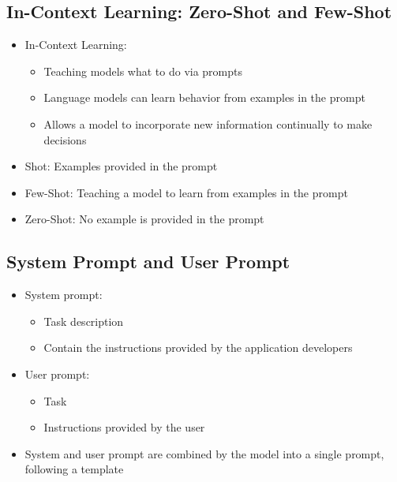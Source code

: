 \documentclass[11pt]{scrartcl}
\begin{document}
\subsection*{In-Context Learning: Zero-Shot and Few-Shot}
\begin{itemize}
	\item In-Context Learning: 
	\begin{itemize}
		\item Teaching models what to do via prompts
		\item Language models can learn behavior from examples in the prompt
		\item Allows a model to incorporate new information continually to make decisions
	\end{itemize}
	\item Shot: Examples provided in the prompt
	\item Few-Shot: Teaching a model to learn from examples in the prompt
	\item Zero-Shot: No example is provided in the prompt
\end{itemize}

\subsection*{System Prompt and User Prompt}
\begin{itemize}
	\item System prompt: 
	\begin{itemize}
		\item Task description
		\item Contain the instructions provided by the application developers
	\end{itemize}
	\item User prompt: 
	\begin{itemize}
		\item Task
		\item Instructions provided by the user
	\end{itemize}
	\item System and user prompt are combined by the model into a single prompt, following a template
\end{itemize}
\end{document}
